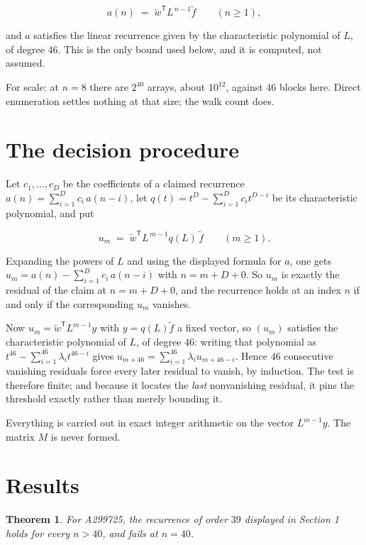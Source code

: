 \documentclass[11pt]{article}
\newtheorem{theorem}{Theorem}
\theoremstyle{definition}
\begin{document}
\[a(n) \;=\; \tilde w^{\mathsf T} L^{\,n-1} \tilde f \qquad (n \ge 1),\]

and $a$ satisfies the linear recurrence given by the characteristic polynomial of $L$, of degree $46$. This is the only bound used below, and it is computed, not assumed.

For scale: at $n = 8$ there are $2^{40}$ arrays, about $10^{12}$, against $46$ blocks here. Direct enumeration settles nothing at that size; the walk count does.

\section{The decision procedure}

Let $c_1,\dots,c_D$ be the coefficients of a claimed recurrence $a(n) = \sum_{i=1}^{D} c_i\,a(n-i)$, let $q(t) = t^{D} - \sum_{i=1}^{D} c_i t^{D-i}$ be its characteristic polynomial, and put

\[u_m \;=\; \tilde w^{\mathsf T} L^{\,m-1} q(L)\,\tilde f \qquad (m \ge 1).\]

Expanding the powers of $L$ and using the displayed formula for $a$, one gets $u_m = a(n) - \sum_{i=1}^{D} c_i\,a(n-i)$ with $n = m + D + 0$. So $u_m$ is exactly the residual of the claim at $n = m + D + 0$, and the recurrence holds at an index $n$ if and only if the corresponding $u_m$ vanishes.

Now $u_m = \tilde w^{\mathsf T} L^{m-1} y$ with $y = q(L)\tilde f$ a fixed vector, so $(u_m)$ satisfies the characteristic polynomial of $L$, of degree $46$: writing that polynomial as $t^{46} - \sum_{i=1}^{46} \lambda_i t^{46-i}$ gives $u_{m+46} = \sum_{i=1}^{46} \lambda_i u_{m+46-i}$. Hence $46$ consecutive vanishing residuals force every later residual to vanish, by induction. The test is therefore finite; and because it locates the {\itshape last} nonvanishing residual, it pins the threshold exactly rather than merely bounding it.

Everything is carried out in exact integer arithmetic on the vector $L^{m-1}y$. The matrix $M$ is never formed.

\section{Results}

\begin{theorem} For A299725, the recurrence of order $39$ displayed in Section 1 holds for every $n > 40$, and fails at $n = 40$.\end{theorem}
\end{document}

